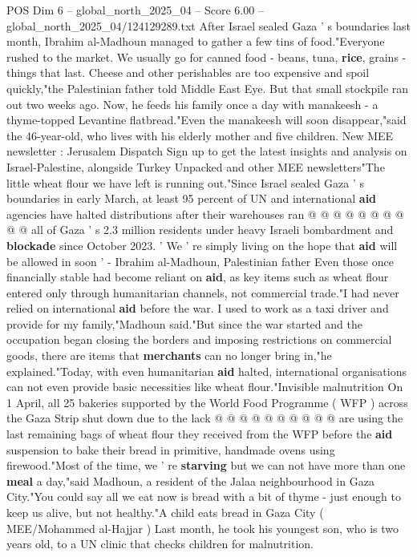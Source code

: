 \begin{textsample}{POS Dim 6 – global\_north\_2025\_04 – Score 6.00 – global\_north\_2025\_04/124129289.txt}  \label{ex:f6_pos_204}
After Israel sealed Gaza ' s boundaries last month, Ibrahim al-Madhoun managed to gather a few tins of food."Everyone rushed to the market.
We usually go for canned food - beans, tuna, \textbf{rice}, grains - things that last.
Cheese and other perishables are too expensive and spoil quickly,"the Palestinian father told Middle East Eye.
But that small stockpile ran out two weeks ago.
Now, he feeds his family once a day with manakeesh - a thyme-topped Levantine flatbread."Even the manakeesh will soon disappear,"said the 46-year-old, who lives with his elderly mother and five children.
New MEE newsletter : Jerusalem Dispatch Sign up to get the latest insights and analysis on Israel-Palestine, alongside Turkey Unpacked and other MEE newsletters"The little wheat flour we have left is running out."Since Israel sealed Gaza ' s boundaries in early March, at least 95 percent of UN and international \textbf{aid} agencies have halted distributions after their warehouses ran @ @ @ @ @ @ @ @ @ @ all of Gaza ' s 2.3 million residents under heavy Israeli bombardment and \textbf{blockade} since October 2023. ' We ' re simply living on the hope that \textbf{aid} will be allowed in soon ' - Ibrahim al-Madhoun, Palestinian father Even those once financially stable had become reliant on \textbf{aid}, as key items such as wheat flour entered only through humanitarian channels, not commercial trade."I had never relied on international \textbf{aid} before the war.
I used to work as a taxi driver and provide for my family,"Madhoun said."But since the war started and the occupation began closing the borders and imposing restrictions on commercial goods, there are items that \textbf{merchants} can no longer bring in,"he explained."Today, with even humanitarian \textbf{aid} halted, international organisations can not even provide basic necessities like wheat flour."Invisible malnutrition On 1 April, all 25 bakeries supported by the World Food Programme ( WFP ) across the Gaza Strip shut down due to the lack @ @ @ @ @ @ @ @ @ @ are using the last remaining bags of wheat flour they received from the WFP before the \textbf{aid} suspension to bake their bread in primitive, handmade ovens using firewood."Most of the time, we ' re \textbf{starving} but we can not have more than one \textbf{meal} a day,"said Madhoun, a resident of the Jalaa neighbourhood in Gaza City."You could say all we eat now is bread with a bit of thyme - just enough to keep us alive, but not healthy."A child eats bread in Gaza City ( MEE/Mohammed al-Hajjar ) Last month, he took his youngest son, who is two years old, to a UN clinic that checks children for malnutrition.

\end{textsample}
